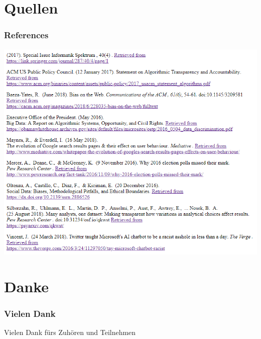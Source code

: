 \section*{Quellen}
\begin{frame}
\frametitle{References}
\includegraphics[width=\textwidth]{img/ref}
\end{frame}

\section*{Danke}
\begin{frame}
\frametitle{Vielen Dank}
Vielen Dank fürs Zuhören und Teilnehmen
\end{frame}